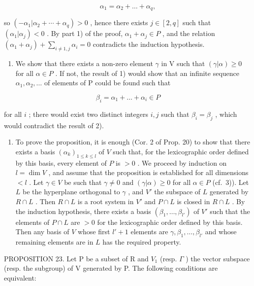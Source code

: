 \[
\alpha_ {1} = \alpha_ {2} + \dots + \alpha_ {q},
\]

so \((-\alpha_{1}|\alpha_{2}+\cdots+\alpha_{q})>0\) , hence there exists \(j\in[2,q]\) such that \((\alpha_{1}|\alpha_{j})<0\) . By part 1) of the proof, \(\alpha_{1}+\alpha_{j}\in P\) , and the relation \((\alpha_{1}+\alpha_{j})+\sum_{i\neq1,j}\alpha_{i}=0\) contradicts the induction hypothesis.

\begin{enumerate}
\def\labelenumi{\arabic{enumi})}
\setcounter{enumi}{2}
\tightlist
\item
  We show that there exists a non-zero element \(\gamma\) in V such that \((\gamma|\alpha) \geqslant 0\) for all \(\alpha \in P\) . If not, the result of 1) would show that an infinite sequence \(\alpha_{1}, \alpha_{2}, \ldots\) of elements of P could be found such that
\end{enumerate}

\[
\beta_ {i} = \alpha_ {1} + \dots + \alpha_ {i} \in P
\]

for all \(i\) ; there would exist two distinct integers \(i, j\) such that \(\beta_{i} = \beta_{j}\) , which would contradict the result of 2).

\begin{enumerate}
\def\labelenumi{\arabic{enumi})}
\setcounter{enumi}{3}
\tightlist
\item
  To prove the proposition, it is enough (Cor. 2 of Prop. 20) to show that there exists a basis \((\alpha_{k})_{1\leqslant k\leqslant l}\) of \(V\) such that, for the lexicographic order defined by this basis, every element of \(P\) is \(>0\) . We proceed by induction on \(l = \dim V\) , and assume that the proposition is established for all dimensions \(< l\) . Let \(\gamma \in V\) be such that \(\gamma \neq 0\) and \((\gamma |\alpha)\geqslant 0\) for all \(\alpha \in P\) (cf.~3)). Let \(L\) be the hyperplane orthogonal to \(\gamma\) , and \(V'\) the subspace of \(L\) generated by \(R\cap L\) . Then \(R\cap L\) is a root system in \(V'\) and \(P\cap L\) is closed in \(R\cap L\) . By the induction hypothesis, there exists a basis \((\beta_{1},\ldots ,\beta_{l'})\) of \(V'\) such that the elements of \(P\cap L\) are \(>0\) for the lexicographic order defined by this basis. Then any basis of \(V\) whose first \(l' + 1\) elements are \(\gamma ,\beta_{1},\ldots ,\beta_{l'}\) and whose remaining elements are in \(L\) has the required property.
\end{enumerate}

PROPOSITION 23. Let P be a subset of R and \(V_{1}\) (resp. \(\Gamma\) ) the vector subspace (resp. the subgroup) of V generated by P. The following conditions are equivalent:

